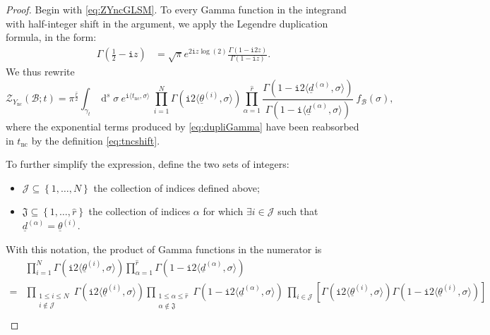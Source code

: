 \documentclass[12pt,a4paper,oneside]{amsart}
\numberwithin{equation}{section}
\theoremstyle{definition}
\theoremstyle{remark}
\DeclareMathOperator{\dd}{d}
\newcommand{\mz}{\mathcal{Z}}
\newcommand{\Br}{\mathcal{B}}
\newcommand{\Ync}{Y_{\mathrm{nc}}}
\newcommand{\ii}{\mathtt{i}}
\newcommand{\tnc}{t_{\mathrm{nc}}}
\begin{document}
\begin{proof}
Begin with \eqref{eq:ZYncGLSM}. To every Gamma function in the integrand with half-integer shift in the argument, we apply the Legendre duplication formula, in the form:
\begin{align}\label{eq:dupliGamma}
	\Gamma \left( \frac{1}{2}- \ii z \right) &= \sqrt{\pi} e^{2 \ii z \log (2) } \frac{  \Gamma \left( 1 - \ii 2 z \right) }{   \Gamma \left( 1 - \ii z  \right)} .
\end{align}
We thus rewrite 
\begin{equation}
\label{eq:ZYncduplic}
	\mz_{\Ync} \left( \Br; t \right) = \pi^{\frac{\hat{r}}{2}} \int_{\gamma_t} \dd^s \sigma~e^{\ii \langle \tnc, \sigma\rangle } ~\prod_{i=1}^{N} \Gamma \left( \ii 2 \langle \underline{\theta}^{(i)}, \sigma \rangle \right) \prod_{\alpha=1}^{\hat{r}} \frac{\Gamma \left( 1 - \ii 2 \langle\underline{d}^{(\alpha)}, \sigma \rangle \right) }{\Gamma \left( 1 - \ii \langle\underline{d}^{(\alpha)}, \sigma \rangle \right)}   ~f_{\Br} (\sigma) ,
\end{equation}
where the exponential terms produced by \eqref{eq:dupliGamma} have been reabsorbed in $\tnc$ by the definition \eqref{eq:tncshift}.\par
To further simplify the expression, define the two sets of integers:
\begin{itemize}
\item $\mathcal{J} \subseteq \left\{ 1, \dots, N \right\}$ the collection of indices defined above;
\item $\mathfrak{J} \subseteq \left\{ 1, \dots, \hat{r} \right\}$ the collection of indices $\alpha$ for which $\exists i \in \mathcal{J}$ such that $\underline{d}^{(\alpha)} = \underline{\theta}^{(i)}$.
\end{itemize}
With this notation, the product of Gamma functions in the numerator is 
\begin{align*}
	&\prod_{i=1}^{N} \Gamma \left( \ii 2 \langle \underline{\theta}^{(i)}, \sigma \rangle \right) \prod_{\alpha =1}^{\hat{r}} \Gamma \left( 1 - \ii 2 \langle\underline{d}^{(\alpha)}, \sigma \rangle \right) \\
 = &\prod_{\substack{ 1 \le i \le N \\ i \notin \mathcal{J} }} \Gamma \left( \ii 2 \langle \underline{\theta}^{(i)}, \sigma \rangle \right) \prod_{\substack{ 1 \le \alpha \le \hat{r} \\ \alpha \notin \mathfrak{J}} } \Gamma \left( 1 - \ii 2 \langle\underline{d}^{(\alpha)}, \sigma \rangle \right) ~ \prod_{i \in \mathcal{J} } \left[ \Gamma \left( \ii 2 \langle \underline{\theta}^{(i)}, \sigma \rangle \right) \Gamma \left( 1 - \ii 2 \langle\underline{\theta}^{(i)}, \sigma \rangle \right) \right] \\

\end{align*}
\end{proof}
\end{document}
